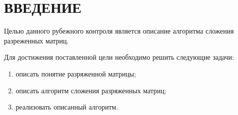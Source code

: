 \chapter*{ВВЕДЕНИЕ}

Целью данного рубежного контроля является описание алгоритма сложения разреженных матриц.

Для достижения поставленной цели необходимо решить следующие задачи:
\begin{enumerate}
	\item описать понятие разряженной матрицы;
	\item описать алгоритм сложения разряженных матриц;
	\item реализовать описанный алгоритм.
\end{enumerate}

